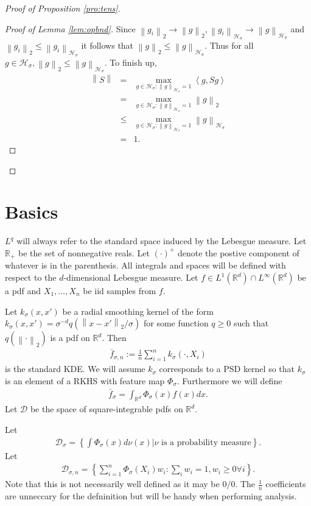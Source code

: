 \documentclass{article} %
\def\hsig{{\mathcal{H}_\sigma}}
\def\d2{{\mathcal{D}}}
\def\dsig{{\mathcal{D}_\sigma}}
\def\dsign{{\mathcal{D}_{\sigma,n}}}
\def\ksig{{k_\sigma}}
\def\kde{{\bar{f}_{\sigma,n}}} %
\def\gkde{{\bar{f}_\sigma}} %
\def\fm{{\Phi_\sigma}} %
\def\rn{\mathbb{R}}
\def\l{\left}
\def\r{\right}
\theoremstyle{definition}
\begin{document}
\begin{proof}[Proof of Proposition \ref{pro:tens}]
\begin{proof}[Proof of Lemma \ref{lem:opbnd}]
                    Since $\l\| g_i \r\|_2 \to \l\|g\r\|_2, \l\|g_i\r\|_\hsig \to \l\|g\r\|_\hsig$ and $\l\|g_i\r\|_2 \le \l\|g_i\r\|_\hsig$ it follows that $\l\|g\r\|_2 \le \l\|g\r\|_\hsig$. Thus for all $g\in \hsig, \l\|g\r\|_2 \le \l\|g\r\|_\hsig$. To finish up,
                    \begin{eqnarray*}
                        \l\|S\r\|
                        &=& \max_{g\in \hsig: \l\|g\r\|_\hsig = 1} \l<g,Sg\r>\\
                        &=& \max_{g\in \hsig: \l\|g\r\|_\hsig = 1} \l\|g\r\|_2\\
                        &\le& \max_{g\in \hsig: \l\|g\r\|_\hsig = 1} \l\|g\r\|_\hsig\\
                        &=&  1.
                    \end{eqnarray*}
	\end{proof}

\end{proof}
\section{Basics}
$L^q$ will always refer to the standard space induced by the Lebesgue measure.
Let $\rn_+$ be the set of nonnegative reals. Let $\left( \cdot \right)^+$ denote the postive component of whatever is in the parenthesis.
All integrals and spaces will be defined with respect to the $d$-dimensional Lebesgue measure. Let $f \in L^1\left(  \rn^d\right) \cap L^\infty\left(  \rn^d\right)$ be a pdf and $X_1,\dots, X_n$ be iid samples from $f$.

Let $\ksig\l(x,x'\r)$ be a radial smoothing kernel of the form $\ksig\l(x,x'\r) = \sigma^{-d} q\l(\l\|x-x'\r\|_2/\sigma\r)$ for some function $q\ge0$ such that $q\l(\l\|\cdot\r\|_2\r)$ is a pdf on $\rn^d$. Then
\begin{eqnarray*}
	\kde := \frac{1}{n}\sum_{i=1}^n\ksig\l(\cdot,X_i\r)
\end{eqnarray*}
is the standard KDE.
We will assume $\ksig$ corresponds to a PSD kernel so that $\ksig$ is an element of a RKHS with feature map $\fm$.
Furthermore we will define
\begin{eqnarray*}
	\gkde = \int_{\rn^d} \fm\left( x \right) f\left( x \right) dx.
\end{eqnarray*}
Let $\d2$ be the space of square-integrable pdfs on $\rn^d$.

Let 
\begin{eqnarray*}
	\dsig =\left\{\int \Phi_\sigma(x) d\nu(x) \Big| \nu \textrm{ is a probability measure}  \right\}.
\end{eqnarray*}
Let 
\begin{eqnarray*}
	\dsign = \left\{ \sum_{i=1}^n \fm\left( X_i \right)w_i : \sum_i w_i = 1, w_i\ge0 \forall i  \right\}.
\end{eqnarray*}
Note that this is not necessarily well defined as it may be $0/0$. The $\frac{1}{n}$ coefficients are unneccary for the defninition but will be handy when performing analysis.
\end{document}
